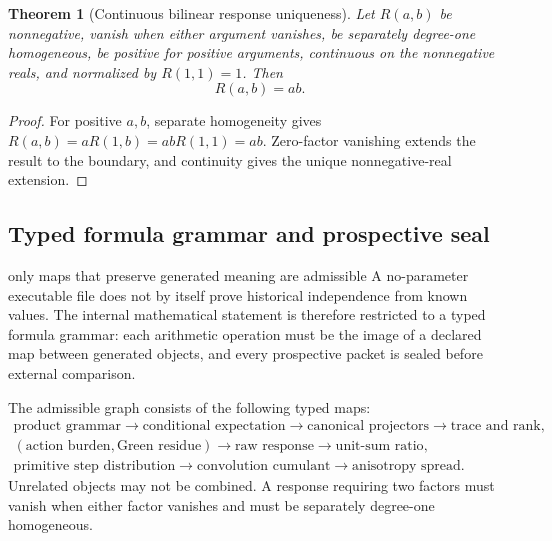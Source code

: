 \documentclass[11pt]{article}
\numberwithin{equation}{section}
\newtheorem{theorem}[definition]{Theorem}
\theoremstyle{remark}
\begin{document}
\begin{theorem}[Continuous bilinear response uniqueness]
Let $R(a,b)$ be nonnegative, vanish when either argument vanishes, be separately degree-one homogeneous, be positive for positive arguments, continuous on the nonnegative reals, and normalized by $R(1,1)=1$. Then
\begin{equation}
R(a,b)=ab.
\end{equation}
\end{theorem}
\begin{proof}
For positive $a,b$, separate homogeneity gives $R(a,b)=aR(1,b)=abR(1,1)=ab$. Zero-factor vanishing extends the result to the boundary, and continuity gives the unique nonnegative-real extension.
\end{proof}


\subsection{Typed formula grammar and prospective seal}
\begin{interpretivebridge}{only maps that preserve generated meaning are admissible}
A no-parameter executable file does not by itself prove historical independence from known values. The internal mathematical statement is therefore restricted to a typed formula grammar: each arithmetic operation must be the image of a declared map between generated objects, and every prospective packet is sealed before external comparison.
\end{interpretivebridge}

The admissible graph consists of the following typed maps:
\begin{equation}
\begin{array}{c}
\text{product grammar}\to\text{conditional expectation}\to\text{canonical projectors}\to\text{trace and rank},\\
(\text{action burden},\text{Green residue})\to\text{raw response}\to\text{unit-sum ratio},\\
\text{primitive step distribution}\to\text{convolution cumulant}\to\text{anisotropy spread}.
\end{array}
\end{equation}
Unrelated objects may not be combined. A response requiring two factors must vanish when either factor vanishes and must be separately degree-one homogeneous.
\end{document}
